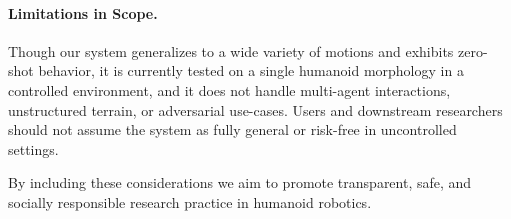 \paragraph{Limitations in Scope.} 
Though our system generalizes to a wide variety of motions and exhibits zero-shot behavior, it is currently tested on a single humanoid morphology in a controlled environment, and it does not handle multi-agent interactions, unstructured terrain, or adversarial use-cases. Users and downstream researchers should not assume the system as fully general or risk-free in uncontrolled settings.

By including these considerations we aim to promote transparent, safe, and socially responsible research practice in humanoid robotics.
